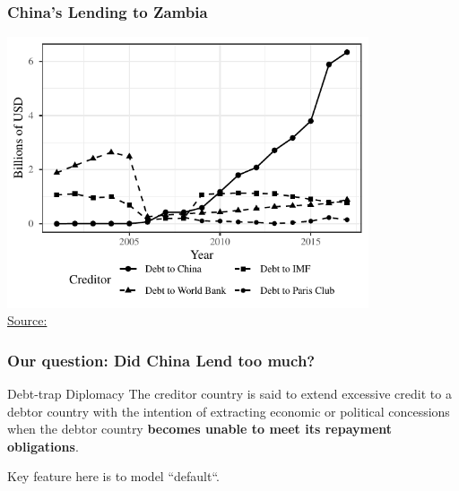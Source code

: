 \documentclass[mathserif]{beamer}
\begin{document}
    \begin{frame}[label = {pak_ts}]
        \frametitle{China's Lending to Zambia}
        \begin{center}
            \includegraphics[width = 0.8\textwidth]{fig/ALL/Zambia_debt_source.pdf}\\
            \small \hyperlink{pak_ds}{Source: }\citet*{Horn-Reinhart-Trebesch-21}
        \end{center}
    \end{frame}

    \begin{frame}
        \frametitle{Our question: Did China Lend too much?}
            \begin{block}{Debt-trap Diplomacy}
               The creditor country is said to extend excessive credit to a debtor country with the intention of extracting economic or political concessions when the debtor country \textbf{becomes unable to meet its repayment obligations}.
            \end{block}
            \pause
            \vfill
            Key feature here is to model ``default``.
    \end{frame}
\end{document}
